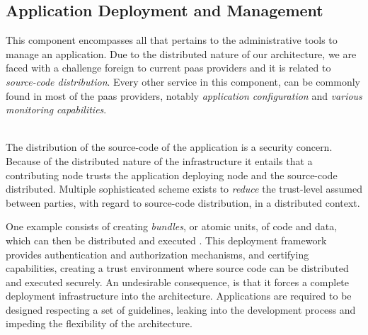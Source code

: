 \documentclass[12pt, titlepage]{uo_temp}
\begin{document}
     \subsection{Application Deployment and Management}
     This component encompasses all that pertains to the administrative tools to manage an
     application. Due to the distributed nature of our architecture, we are faced with a
     challenge foreign to current \gls{paas} providers and it is related to
     \emph{source-code distribution}. Every other service in this component, can be
     commonly found in most of the \gls{paas} providers, notably \emph{application
       configuration} and \emph{various monitoring capabilities}.

     \\ The distribution of the source-code of the application is a security concern.
     Because of the distributed nature of the infrastructure it entails that a
     contributing node trusts the application deploying node and the source-code
     distributed. Multiple sophisticated scheme exists to \emph{reduce} the trust-level
     assumed between parties, with regard to source-code distribution, in a distributed
     context.
     
     One example consists of creating \emph{bundles}, or atomic units, of code and data,
     which can then be distributed and executed \cite{dearle2004flexible}. This deployment
     framework provides authentication and authorization mechanisms, and certifying
     capabilities, creating a trust environment where source code can be distributed and
     executed securely. An undesirable consequence, is that it forces a complete
     deployment infrastructure into the architecture. Applications are required to be
     designed respecting a set of guidelines, leaking into the development process and
     impeding the flexibility of the architecture.
\end{document}
